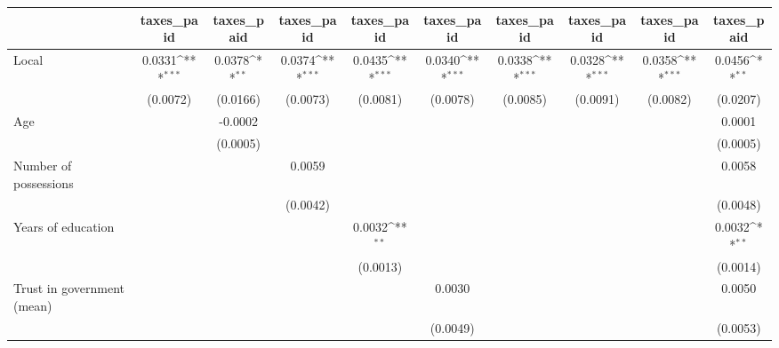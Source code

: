 {
\def\sym#1{\ifmmode^{#1}\else\(^{#1}\)\fi}
\begin{tabular}{l*{9}{c}}
\hline\hline
                &\multicolumn{1}{c}{taxes\_paid}&\multicolumn{1}{c}{taxes\_paid}&\multicolumn{1}{c}{taxes\_paid}&\multicolumn{1}{c}{taxes\_paid}&\multicolumn{1}{c}{taxes\_paid}&\multicolumn{1}{c}{taxes\_paid}&\multicolumn{1}{c}{taxes\_paid}&\multicolumn{1}{c}{taxes\_paid}&\multicolumn{1}{c}{taxes\_paid}\\
\hline
Local           &   0.0331\sym{***}&   0.0378\sym{**} &   0.0374\sym{***}&   0.0435\sym{***}&   0.0340\sym{***}&   0.0338\sym{***}&   0.0328\sym{***}&   0.0358\sym{***}&   0.0456\sym{**} \\
                & (0.0072)         & (0.0166)         & (0.0073)         & (0.0081)         & (0.0078)         & (0.0085)         & (0.0091)         & (0.0082)         & (0.0207)         \\
Age             &                  &  -0.0002         &                  &                  &                  &                  &                  &                  &   0.0001         \\
                &                  & (0.0005)         &                  &                  &                  &                  &                  &                  & (0.0005)         \\
Number of possessions&                  &                  &   0.0059         &                  &                  &                  &                  &                  &   0.0058         \\
                &                  &                  & (0.0042)         &                  &                  &                  &                  &                  & (0.0048)         \\
Years of education&                  &                  &                  &   0.0032\sym{**} &                  &                  &                  &                  &   0.0032\sym{**} \\
                &                  &                  &                  & (0.0013)         &                  &                  &                  &                  & (0.0014)         \\
Trust in government (mean)&                  &                  &                  &                  &   0.0030         &                  &                  &                  &   0.0050         \\
                &                  &                  &                  &                  & (0.0049)         &                  &                  &                  & (0.0053)         \\

\end{tabular}}
